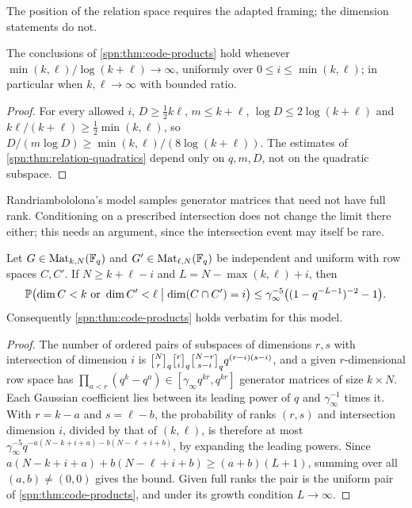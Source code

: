 The position of the relation space requires the adapted framing; the dimension statements do not.

\begin{corollary}\label{spn:cor:code-range}
The conclusions of \cref{spn:thm:code-products} hold whenever $\min(k,\ell)/\log(k+\ell)\to\infty$,
uniformly over $0\le i\le\min(k,\ell)$; in particular when $k,\ell\to\infty$ with bounded ratio.
\end{corollary}

\begin{proof}
For every allowed $i$, $D\ge\frac12k\ell$, $m\le k+\ell$, $\log D\le2\log(k+\ell)$ and
$k\ell/(k+\ell)\ge\frac12\min(k,\ell)$, so $D/(m\log D)\ge\min(k,\ell)/(8\log(k+\ell))$. The estimates of
\cref{spn:thm:relation-quadratics} depend only on $q,m,D$, not on the quadratic subspace.
\end{proof}

Randriambololona's model samples generator matrices that need not have full rank. Conditioning on a
prescribed intersection does not change the limit there either; this needs an argument, since the
intersection event may itself be rare.

\begin{proposition}\label{spn:prop:code-generator}
Let $G\in\operatorname{Mat}_{k,N}(\mathbb{F}_q)$ and $G'\in\operatorname{Mat}_{\ell,N}(\mathbb{F}_q)$ be independent and uniform with row
spaces $C,C'$. If $N\ge k+\ell-i$ and $L=N-\max(k,\ell)+i$, then
\[
 \mathbb{P}\bigl(\dim C<k\text{ or }\dim C'<\ell\bigm|\dim(C\cap C')=i\bigr)\le
 \gamma_\infty^{-5}\bigl((1-q^{-L-1})^{-2}-1\bigr).
\]
Consequently \cref{spn:thm:code-products} holds verbatim for this model.
\end{proposition}

\begin{proof}
The number of ordered pairs of subspaces of dimensions $r,s$ with intersection of dimension $i$ is
$\spnqbin Nr{q}\spnqbin ri{q}\spnqbin{N-r}{s-i}{q}q^{(r-i)(s-i)}$, and a given $r$-dimensional row
space has $\prod_{a<r}(q^k-q^a)\in[\gamma_\infty q^{kr},q^{kr}]$ generator matrices of size $k\times N$.
Each Gaussian coefficient lies between its leading power of $q$ and $\gamma_\infty^{-1}$ times it. With
$r=k-a$ and $s=\ell-b$, the probability of ranks $(r,s)$ and intersection dimension $i$, divided by that
of $(k,\ell)$, is therefore at most $\gamma_\infty^{-5}q^{-a(N-k+i+a)-b(N-\ell+i+b)}$, by expanding the
leading powers. Since $a(N-k+i+a)+b(N-\ell+i+b)\ge(a+b)(L+1)$, summing over all $(a,b)\ne(0,0)$ gives
the bound. Given full ranks the pair is the uniform pair of \cref{spn:thm:code-products}, and under its
growth condition $L\to\infty$.
\end{proof}

